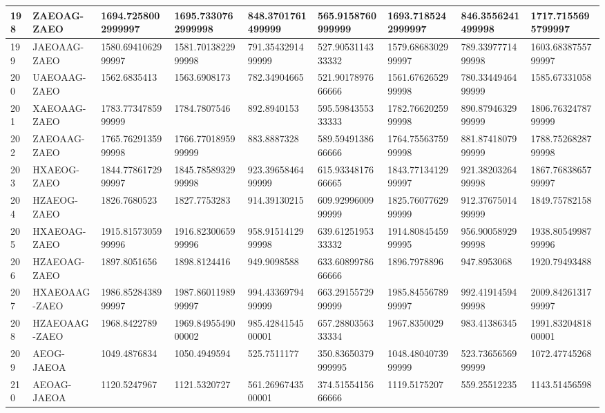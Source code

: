 {\begin{longtable}{|l|l|l|l|l|l|l|l|l|}
        198 & ZAEOAG-ZAEO & 1694.7258002999997 & 1695.7330762999998 & 848.3701761499999 & 565.9158760999999 & 1693.7185242999997 & 846.3556241499998 & 1717.7155695799997 \\ \hline
        199 & JAEOAAG-ZAEO & 1580.6941062999997 & 1581.7013822999998 & 791.3543291499999 & 527.9053114333332 & 1579.6868302999997 & 789.3397771499998 & 1603.6838755799997 \\ \hline
        200 & UAEOAAG-ZAEO & 1562.6835413 & 1563.6908173 & 782.34904665 & 521.9017897666666 & 1561.6762652999998 & 780.3344946499999 & 1585.67331058 \\ \hline
        201 & XAEOAAG-ZAEO & 1783.7734785999999 & 1784.7807546 & 892.8940153 & 595.5984355333333 & 1782.7662025999998 & 890.8794632999999 & 1806.7632478799999 \\ \hline
        202 & ZAEOAAG-ZAEO & 1765.7629135999998 & 1766.7701895999999 & 883.8887328 & 589.5949138666666 & 1764.7556375999998 & 881.8741807999999 & 1788.7526828799998 \\ \hline
        203 & HXAEOG-ZAEO & 1844.7786172999997 & 1845.7858932999998 & 923.3965846499999 & 615.9334817666665 & 1843.7713412999997 & 921.3820326499998 & 1867.7683865799997 \\ \hline
        204 & HZAEOG-ZAEO & 1826.7680523 & 1827.7753283 & 914.39130215 & 609.9299600999999 & 1825.7607762999999 & 912.3767501499999 & 1849.75782158 \\ \hline
        205 & HXAEOAG-ZAEO & 1915.8157305999996 & 1916.8230065999996 & 958.9151412999998 & 639.6125195333332 & 1914.8084545999995 & 956.9005892999998 & 1938.8054998799996 \\ \hline
        206 & HZAEOAG-ZAEO & 1897.8051656 & 1898.8124416 & 949.9098588 & 633.6089978666666 & 1896.7978896 & 947.8953068 & 1920.79493488 \\ \hline
        207 & HXAEOAAG-ZAEO & 1986.8528438999997 & 1987.8601198999997 & 994.4336979499999 & 663.2915572999999 & 1985.8455678999997 & 992.4191459499998 & 2009.8426131799997 \\ \hline
        208 & HZAEOAAG-ZAEO & 1968.8422789 & 1969.8495549000002 & 985.4284154500001 & 657.2880356333334 & 1967.8350029 & 983.41386345 & 1991.8320481800001 \\ \hline
        209 & AEOG-JAEOA & 1049.4876834 & 1050.4949594 & 525.7511177 & 350.83650379999995 & 1048.4804073999999 & 523.7365656999999 & 1072.47745268 \\ \hline
        210 & AEOAG-JAEOA & 1120.5247967 & 1121.5320727 & 561.2696743500001 & 374.5155415666666 & 1119.5175207 & 559.25512235 & 1143.51456598 \\ \hline

\end{longtable}}
